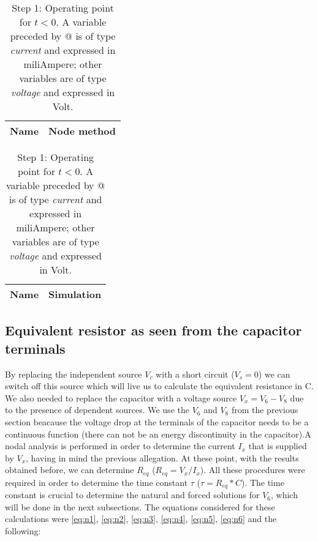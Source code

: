 \begin{table}[H]
\parbox{.45\linewidth}{
  \centering 
  \begin{tabular}{|l|r|}
    \hline    
    {\bf Name} & {\bf Node method}\\ \hline
    
  \end{tabular}
  \caption{A variable that starts with "@ " is of type {\em current}
    and expressed in milliampere (mA); all the other variables that start with a "V" are of the type {\it voltage} and expressed in
    Volt (V).}
  \label{tab:theoretical}
  
 }
 \hfill
 \parbox{.45\linewidth}{
 \centering
  \begin{tabular}{|l|r|}
    \hline    
    {\bf Name} & {\bf Simulation} \\ \hline
    
  \end{tabular}
  \caption{Step 1: Operating point for $t<0$. A variable preceded by @ is of type {\em current}
    and expressed in miliAmpere; other variables are of type {\it voltage} and expressed in
    Volt.}
  \label{tab:op}
 
 }
\end{table}



\subsection{Equivalent resistor as seen from the capacitor terminals}
By replacing the independent source $V_c$ with a short circuit ($V_s=0$) we can switch off this source which will live us to calculate the equivalent resistance in C. We also needed to replace the capacitor with a voltage source $V_x=V_6-V_8$ due to the presence of dependent sources. We use the $V_6$ and $V_8$ from the previous section beacause the voltage drop at the terminals of the capacitor needs to be a continuous function (there can not be an energy discontinuity in the capacitor).A nodal analysis is performed in order to determine the current $I_x$ that is supplied by $V_x$, having in mind the previous allegation. At these point, with the results obtained before, we can determine $R_{eq}$ ($R_{eq}=V_x/I_x$). All these procedures were required in order to determine the time constant $\tau$ ($\tau=R_{eq}*C$). The time constant is crucial to determine the natural and forced solutions for $V_6$, which will be done in the next subsections. The equations considered for these calculations were \ref{eq:n1}, \ref{eq:n2}, \ref{eq:n3}, \ref{eq:n4}, \ref{eq:n5}, \ref{eq:n6} and the following:

